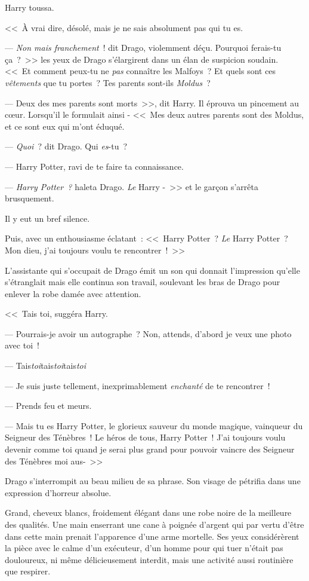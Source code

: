 Harry toussa. 

<<~À vrai dire, désolé, mais je ne sais absolument pas qui tu es.

--- \emph{Non mais franchement}~! dit Drago, violemment déçu. Pourquoi ferais-tu ça~?~>> les yeux de Drago s'élargirent dans un élan de suspicion soudain. <<~Et comment peux-tu ne \emph{pas} connaître les Malfoys~? Et quels sont ces \emph{vêtements} que tu portes~? Tes parents sont-ils \emph{Moldus}~?

--- Deux des mes parents sont morts~>>, dit Harry. Il éprouva un pincement au cœur. Lorsqu'il le formulait ainsi - <<~Mes deux autres parents sont des Moldus, et ce sont eux qui m'ont éduqué.

--- \emph{Quoi}~? dit Drago. Qui \emph{es}-tu~?

--- Harry Potter, ravi de te faire ta connaissance.

--- \emph{Harry Potter~?} haleta Drago. \emph{Le} Harry -~>> et le garçon s'arrêta brusquement.

Il y eut un bref silence.

Puis, avec un enthousiasme éclatant~: <<~Harry Potter~? \emph{Le} Harry Potter~? Mon dieu, j'ai toujours voulu te rencontrer~!~>>

L'assistante qui s'occupait de Drago émit un son qui donnait l'impression qu'elle s'étranglait mais elle continua son travail, soulevant les bras de Drago pour enlever la robe damée avec attention.

<<~Tais toi, suggéra Harry.

--- Pourrais-je avoir un autographe~? Non, attends, d'abord je veux une photo avec toi~!

--- Tais\emph{toi}tais\emph{toi}tais\emph{toi}

--- Je suis juste tellement, inexprimablement \emph{enchanté} de te rencontrer~!

--- Prends feu et meurs.

--- Mais tu es Harry Potter, le glorieux sauveur du monde magique, vainqueur du Seigneur des Ténèbres~! Le héros de tous, Harry Potter~! J'ai toujours voulu devenir comme toi quand je serai plus grand pour pouvoir vaincre des Seigneur des Ténèbres moi aus-~>>

Drago s'interrompit au beau milieu de sa phrase. Son visage de pétrifia dans une expression d'horreur absolue.

Grand, cheveux blancs, froidement élégant dans une robe noire de la meilleure des qualités. Une main enserrant une cane à poignée d'argent qui par vertu d'être dans cette main prenait l'apparence d'une arme mortelle. Ses yeux considérèrent la pièce avec le calme d'un exécuteur, d'un homme pour qui tuer n'était pas douloureux, ni même délicieusement interdit, mais une activité aussi routinière que respirer.

